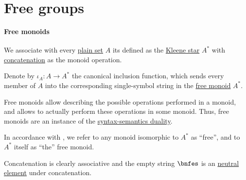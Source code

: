\section{Free groups}\label{sec:free_groups}

\paragraph{Free monoids}

\begin{definition}\label{def:free_monoid}
  We associate with every \hyperref[def:set]{plain set} \( A \) its  defined as the \hyperref[def:formal_language/kleene_star]{Kleene star} \( A^* \) with \hyperref[def:formal_language/concatenation]{concatenation} as the monoid operation.

  Denote by \( \iota_A: A \to A^* \) the canonical inclusion function, which sends every member of \( A \) into the corresponding single-symbol string in the \hyperref[def:free_monoid]{free monoid} \( A^* \).
\end{definition}
\begin{comments}
  \item Free monoids allow describing the possible operations performed in a monoid, and  allows to actually perform these operations in some monoid. Thus, free monoids are an instance of the \hyperref[con:syntax_semantics_duality]{syntax-semantics duality}.

  \item In accordance with , we refer to any monoid isomorphic to \( A^* \) as \enquote{free}, and to \( A^* \) itself as \enquote{the} free monoid.
\end{comments}
\begin{defproof}
  Concatenation is clearly associative and the empty string \( \bnfes \) is an \hyperref[def:monoid]{neutral element} under concatenation.
\end{defproof}

